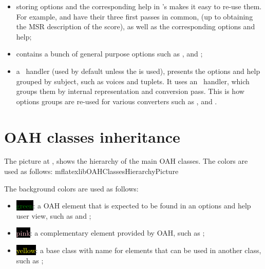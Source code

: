 \begin{itemize}
\item storing options and the corresponding help in 's makes it easy to re-use them.
    For example,  and  have their three first passes in common,
    (up to obtaining the MSR description of the score),
    as well as the corresponding options and help;

\item {} contains a bunch of general purpose options
    such as ,  and ;

\item a \regular\ handler (used by default unless the  is used),
    presents the options and help grouped by subject, such as voices and tuplets.
    It uses an \insider\ handler, which groups them by internal representation
    and conversion pass.
    This is how options groups are re-used for various
    converters such as ,  and .

\end{itemize}


\section{OAH classes inheritance}\label{OAH classes inheritance}

The picture at , shows the hierarchy of the main OAH classes. The  colors are used as follows:
{mflatexlibOAHClassesHierarchyPicture}

The background colors are used as follows:
\begin{itemize}
\item \colorbox{black}{\textcolor{green}{green}}: a OAH element that is expected to be found in an options and help user view, such as  and ;

\item \colorbox{black}{\textcolor{pink}{pink}}: a complementary element provided by OAH, such as ;

\item \colorbox{black}{\textcolor{yellow}{yellow}}: a base class   with name  for elements that can be used in another class, such as ;
\end{itemize}

